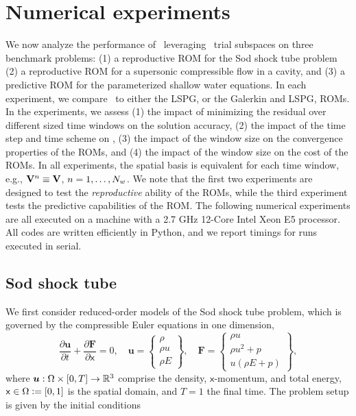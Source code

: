 \section{Numerical experiments}\label{sec:numerical_experiments}
We now analyze the performance of \methodAcronymROMs\ leveraging \spatialAcronym\ trial subspaces on three benchmark problems: (1) a reproductive ROM for the Sod shock tube problem (2) a reproductive ROM for a supersonic compressible flow in a cavity, and (3) a predictive ROM for the parameterized shallow water equations. In each experiment, we compare \methodAcronymROMs\ to either the LSPG, or the Galerkin and LSPG, ROMs. In the experiments, we assess (1) the impact of minimizing the residual over different sized time windows on the solution accuracy, (2) the impact of the time step and time scheme on \methodAcronym, (3) the impact of the window size on the convergence properties of the ROMs, and (4) the impact of the window size on the cost of the ROMs. In all experiments, the spatial basis is equivalent for each time window, e.g., $\mathbf {V}^{n} \equiv \mathbf {V}$, $n=1,\ldots,N_w$. We note that the first two experiments are designed to test the \textit{reproductive} ability of the ROMs, while the third experiment tests the predictive capabilities of the ROM. The following numerical experiments are all executed on a machine with a 2.7 GHz 12-Core Intel Xeon E5 processor. All codes are written efficiently in Python, and we report timings for runs executed in serial. 
 
\subsection{Sod shock tube}
We first consider reduced-order models of the Sod shock tube problem, which is governed by the compressible Euler equations in one dimension, 
\begin{equation}\label{eq:euler_1D}
    \frac{\partial \boldsymbol u}{\partial t} + \frac{\partial \boldsymbol F}{\partial \mathsf{x}} = 0, \quad
    \boldsymbol u= 
    \begin{Bmatrix} \rho \\ \rho u \\ \rho E \end{Bmatrix}, \quad 
    \boldsymbol F = \begin{Bmatrix} \rho u \\ \rho u^2 + p \\  u(\rho E + p) \end{Bmatrix},
\end{equation}
where $\boldsymbol u : \Omega \times [0,T] \rightarrow \mathbb{R}^{3}$ comprise the density, $\mathsf{x}$-momentum, and total energy, $\mathsf{x} \in \Omega \vcentcolon=  [0,1]$ is the spatial domain, and 
$T = 1$ the final time. 
The problem setup is given by the initial conditions

